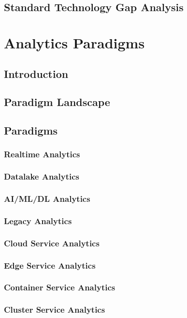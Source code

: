 \documentclass[12pt]{article}
\begin{document}
\subsection{Standard Technology Gap Analysis}

\section{Analytics Paradigms}

\subsection{Introduction}

\subsection{Paradigm Landscape}

\subsection{Paradigms}
\subsubsection{Realtime Analytics} 
\subsubsection{Datalake Analytics} 
\subsubsection{AI/ML/DL  Analytics} 
\subsubsection{Legacy Analytics}
\subsubsection{Cloud Service Analytics}

\subsubsection{Edge Service Analytics}
\subsubsection{Container Service Analytics}
\subsubsection{Cluster Service Analytics}
\end{document}
